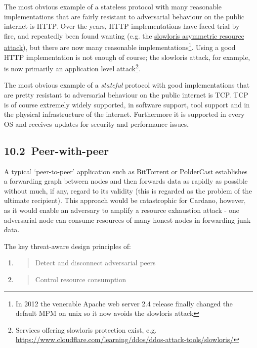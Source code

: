 \documentclass[]{article}
\begin{document}
The most obvious example of a stateless protocol with many reasonable
implementations that are fairly resistant to adversarial behaviour on
the public internet is HTTP. Over the years, HTTP implementations have
faced trial by fire, and repeatedly been found wanting (e.g. the
\href{https://en.wikipedia.org/wiki/Slowloris_(computer_security)}{{slowloris
asymmetric resource attack}}), but there are now many reasonable
implementations\footnote{In 2012 the venerable Apache web server 2.4
  release finally changed the default MPM on unix so it now avoids the
  slowloris attack}. Using a good HTTP implementation is not enough of
course; the slowloris attack, for example, is now primarily an
application level attack\footnote{Services offering slowloris protection
  exist, e.g.
  \href{https://www.cloudflare.com/learning/ddos/ddos-attack-tools/slowloris/}{{https://www.cloudflare.com/learning/ddos/ddos-attack-tools/slowloris/}}}.

The most obvious example of a \emph{stateful} protocol with good
implementations that are pretty resistant to adversarial behaviour on
the public internet is TCP. TCP is of course extremely widely supported,
in software support, tool support and in the physical infrastructure of
the internet. Furthermore it is supported in every OS and receives
updates for security and performance issues.

\hypertarget{peer-with-peer}{%
\subsection{​10.2​~Peer-with-peer}\label{peer-with-peer}}

A typical `peer-to-peer' application such as BitTorrent or PolderCast
establishes a forwarding graph between nodes and then forwards data as
rapidly as possible without much, if any, regard to its validity (this
is regarded as the problem of the ultimate recipient). This approach
would be catastrophic for Cardano, however, as it would enable an
adversary to amplify a resource exhaustion attack - one adversarial node
can consume resources of many honest nodes in forwarding junk data.

The key threat-aware design principles of:

\begin{enumerate}
\def\labelenumi{\arabic{enumi}.}
\item
  \begin{quote}
  Detect and disconnect adversarial peers
  \end{quote}
\item
  \begin{quote}
  Control resource consumption
  \end{quote}
\end{enumerate}
\end{document}
